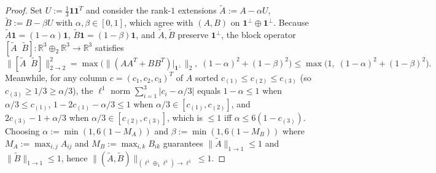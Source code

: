 \documentclass[11pt,a4paper]{article}
\theoremstyle{definition}
\newcommand{\R}{\mathbb{R}}
\newcommand{\one}{\mathbf{1}}
\begin{document}
\begin{proof}
Set $U := \frac{1}{3}\one\one^T$ and consider the rank-$1$ extensions $\tilde{A} := A - \alpha U$, $\tilde{B} := B - \beta U$ with $\alpha, \beta \in [0, 1]$, which agree with $(A,B)$ on $\one^\perp \oplus \one^\perp$. Because $\tilde{A}\one = (1-\alpha)\one$, $\tilde{B}\one = (1-\beta)\one$, and $\tilde{A},\tilde{B}$ preserve $\one^\perp$, the block operator $[\tilde{A}\;\;\tilde{B}] : \R^3 \oplus_2 \R^3 \to \R^3$ satisfies
\[
\|[\tilde{A}\;\;\tilde{B}]\|_{2 \to 2}^2 = \max\!\Big(\|(AA^T + BB^T)|_{\one^\perp}\|_2,\; (1-\alpha)^2 + (1-\beta)^2\Big) \le \max\!\Big(1,\; (1-\alpha)^2 + (1-\beta)^2\Big).
\]
Meanwhile, for any column $c = (c_1, c_2, c_3)^T$ of $A$ sorted $c_{(1)} \le c_{(2)} \le c_{(3)}$ (so $c_{(3)} \ge 1/3 \ge \alpha/3$), the $\ell^1$ norm $\sum_{i=1}^3 |c_i - \alpha/3|$ equals $1 - \alpha \le 1$ when $\alpha/3 \le c_{(1)}$, $1 - 2c_{(1)} - \alpha/3 \le 1$ when $\alpha/3 \in [c_{(1)}, c_{(2)}]$, and $2c_{(3)} - 1 + \alpha/3$ when $\alpha/3 \in [c_{(2)}, c_{(3)}]$, which is $\le 1$ iff $\alpha \le 6(1 - c_{(3)})$. Choosing $\alpha := \min(1, 6(1 - M_A))$ and $\beta := \min(1, 6(1 - M_B))$ where $M_A := \max_{i,j} A_{ij}$ and $M_B := \max_{i,k} B_{ik}$ guarantees $\|\tilde{A}\|_{1\to 1} \le 1$ and $\|\tilde{B}\|_{1\to 1} \le 1$, hence $\|(\tilde{A},\tilde{B})\|_{(\ell^1\oplus_1\ell^1)\to\ell^1} \le 1$.


\end{proof}
\end{document}
